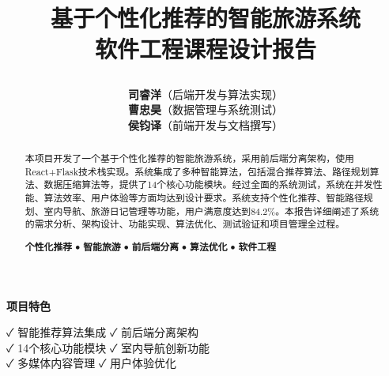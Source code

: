 \documentclass[12pt,a4paper]{article}
\title{
    \vspace{-2cm}
    \begin{tcolorbox}[
        colback=primary,
        coltext=white,
        halign=center,
        rounded corners=10pt,
        drop shadow
    ]
    \huge\textbf{基于个性化推荐的智能旅游系统}\\[0.5cm]
    \Large\textbf{软件工程课程设计报告}
    \end{tcolorbox}
    \vspace{1cm}
}
\author{
    \begin{tcolorbox}[
        colback=light,
        colframe=secondary,
        halign=center,
        rounded corners=5pt,
        width=0.8\textwidth
    ]
    \large
    \textbf{司睿洋}（后端开发与算法实现）\\[0.3cm]
    \textbf{曹忠昊}（数据管理与系统测试）\\[0.3cm]
    \textbf{侯钧译}（前端开发与文档撰写）
    \end{tcolorbox}
}
\date{
    \begin{tcolorbox}[
        colback=secondary!20,
        colframe=secondary,
        halign=center,
        rounded corners=5pt,
        width=0.5\textwidth
    ]
    \large\today
    \end{tcolorbox}
}
\begin{document}
\thispagestyle{empty}
\maketitle

\vfill

\begin{center}
\begin{tcolorbox}[
    colback=accent!20,
    colframe=accent,
    width=0.9\textwidth,
    rounded corners=8pt,
    halign=center
]
\textbf{\large 项目特色}\\[0.3cm]
\begin{minipage}{0.8\textwidth}
\centering
✓ 智能推荐算法集成 \quad ✓ 前后端分离架构\\[0.2cm]
✓ 14个核心功能模块 \quad ✓ 室内导航创新功能\\[0.2cm]
✓ 多媒体内容管理 \quad ✓ 用户体验优化
\end{minipage}
\end{tcolorbox}
\end{center}

\newpage

\begin{abstract}
\begin{tcolorbox}[
    colback=light,
    colframe=primary,
    title={\Large\textbf{摘要}},
    coltitle=white,
    colbacktitle=primary,
    fonttitle=\bfseries,
    rounded corners=8pt,
    drop shadow
]
本项目开发了一个基于个性化推荐的智能旅游系统，采用前后端分离架构，使用React+Flask技术栈实现。系统集成了多种智能算法，包括混合推荐算法、路径规划算法、数据压缩算法等，提供了14个核心功能模块。经过全面的系统测试，系统在并发性能、算法效率、用户体验等方面均达到设计要求。系统支持个性化推荐、智能路径规划、室内导航、旅游日记管理等功能，用户满意度达到84.2\%。本报告详细阐述了系统的需求分析、架构设计、功能实现、算法优化、测试验证和项目管理全过程。
\end{tcolorbox}

\vspace{0.5cm}

\begin{tcolorbox}[
    colback=secondary!10,
    colframe=secondary,
    title={\Large\textbf{关键词}},
    coltitle=white,
    colbacktitle=secondary,
    fonttitle=\bfseries,
    rounded corners=8pt,
    drop shadow
]
\centering
\textbf{个性化推荐} \quad $\bullet$ \quad \textbf{智能旅游} \quad $\bullet$ \quad \textbf{前后端分离} \quad $\bullet$ \quad \textbf{算法优化} \quad $\bullet$ \quad \textbf{软件工程}
\end{tcolorbox}
\end{abstract}
\end{document}
